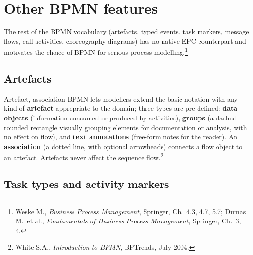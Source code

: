 \section{Other BPMN features}

The rest of the BPMN vocabulary (artefacts, typed events, task markers, message flows, call activities, choreography diagrams) has no native EPC counterpart and motivates the choice of BPMN for serious process modelling.\footnote{Weske M., \emph{Business Process Management}, Springer, Ch.~4.3, 4.7, 5.7; Dumas M.\ et al., \emph{Fundamentals of Business Process Management}, Springer, Ch.~3, 4.}

\subsection{Artefacts}

\begin{definitionbox}{Artefact, association}
BPMN lets modellers extend the basic notation with any kind of \textbf{artefact} appropriate to the domain; three types are pre-defined: \textbf{data objects} (information consumed or produced by activities), \textbf{groups} (a dashed rounded rectangle visually grouping elements for documentation or analysis, with no effect on flow), and \textbf{text annotations} (free-form notes for the reader). An \textbf{association} (a dotted line, with optional arrowheads) connects a flow object to an artefact. Artefacts never affect the sequence flow.\footnote{White S.A., \emph{Introduction to BPMN}, BPTrends, July 2004.}
\end{definitionbox}

\subsection{Task types and activity markers}

